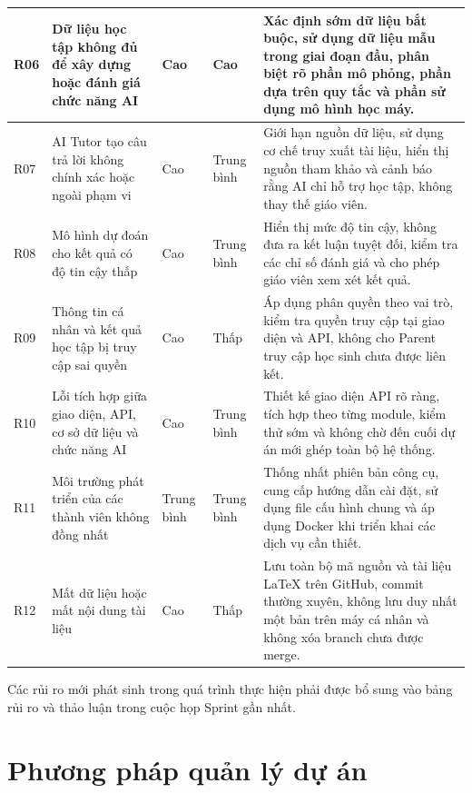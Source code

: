 \begin{longtable}{
		|>{\centering\arraybackslash}p{1.1cm}
		|p{3.3cm}
		|>{\centering\arraybackslash}p{1.8cm}
		|>{\centering\arraybackslash}p{2.0cm}
		|p{5.2cm}|
	}
	R06 &
	Dữ liệu học tập không đủ để xây dựng hoặc đánh giá chức năng AI &
	Cao &
	Cao &
	Xác định sớm dữ liệu bắt buộc, sử dụng dữ liệu mẫu trong giai đoạn đầu,
	phân biệt rõ phần mô phỏng, phần dựa trên quy tắc và phần sử dụng mô hình
	học máy. \\
	\hline
	
	R07 &
	AI Tutor tạo câu trả lời không chính xác hoặc ngoài phạm vi &
	Cao &
	Trung bình &
	Giới hạn nguồn dữ liệu, sử dụng cơ chế truy xuất tài liệu, hiển thị nguồn
	tham khảo và cảnh báo rằng AI chỉ hỗ trợ học tập, không thay thế giáo viên. \\
	\hline
	
	R08 &
	Mô hình dự đoán cho kết quả có độ tin cậy thấp &
	Cao &
	Trung bình &
	Hiển thị mức độ tin cậy, không đưa ra kết luận tuyệt đối, kiểm tra các
	chỉ số đánh giá và cho phép giáo viên xem xét kết quả. \\
	\hline
	
	R09 &
	Thông tin cá nhân và kết quả học tập bị truy cập sai quyền &
	Cao &
	Thấp &
	Áp dụng phân quyền theo vai trò, kiểm tra quyền truy cập tại giao diện
	và API, không cho Parent truy cập học sinh chưa được liên kết. \\
	\hline
	
	R10 &
	Lỗi tích hợp giữa giao diện, API, cơ sở dữ liệu và chức năng AI &
	Cao &
	Trung bình &
	Thiết kế giao diện API rõ ràng, tích hợp theo từng module, kiểm thử sớm
	và không chờ đến cuối dự án mới ghép toàn bộ hệ thống. \\
	\hline
	
	R11 &
	Môi trường phát triển của các thành viên không đồng nhất &
	Trung bình &
	Trung bình &
	Thống nhất phiên bản công cụ, cung cấp hướng dẫn cài đặt, sử dụng file
	cấu hình chung và áp dụng Docker khi triển khai các dịch vụ cần thiết. \\
	\hline
	
	R12 &
	Mất dữ liệu hoặc mất nội dung tài liệu &
	Cao &
	Thấp &
	Lưu toàn bộ mã nguồn và tài liệu LaTeX trên GitHub, commit thường xuyên,
	không lưu duy nhất một bản trên máy cá nhân và không xóa branch chưa được
	merge. \\
	\hline
	
\end{longtable}

Các rủi ro mới phát sinh trong quá trình thực hiện phải được bổ sung vào
bảng rủi ro và thảo luận trong cuộc họp Sprint gần nhất.

\section{Phương pháp quản lý dự án}

